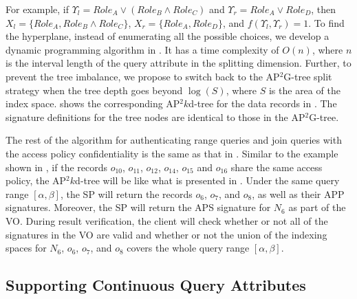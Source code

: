 For example, if $\Upsilon_l = {Role}_{A} \lor ({Role}_{B} \land {Role}_{C})$ and $\Upsilon_r = {Role}_{A} \lor {Role}_{D}$, then $X_l = \{ {Role}_{A}, {Role}_{B} \land {Role}_{C} \}$, $X_r = \{ {Role}_{A}, {Role}_{D} \}$, and $f(\Upsilon_l, \Upsilon_r) = 1$.
To find the hyperplane, instead of enumerating all the possible choices, we develop a dynamic programming algorithm in .
It has a time complexity of $O(n)$, where $n$ is the interval length of the query attribute in the splitting dimension.
Further, to prevent the tree imbalance, we propose to switch back to the AP$^2$G-tree split strategy when the tree depth goes beyond $\log(S)$, where $S$ is the area of the index space.
 shows the corresponding AP$^2k$d-tree for the data records in . The signature definitions for the tree nodes are identical to those in the AP$^2$G-tree.

The rest of the algorithm for authenticating range queries and join queries with the access policy confidentiality is the same as that in .
Similar to the example shown in , if the records $o_{10}$, $o_{11}$, $o_{12}$, $o_{14}$, $o_{15}$ and $o_{16}$ share the same access policy, the AP$^2k$d-tree will be like what is presented in . Under the same query range $[\alpha, \beta]$, the SP will return the records $o_6$, $o_7$, and $o_8$, as well as their APP signatures. Moreover, the SP will return the APS signature for $N_6$ as part of the VO\@. During result verification, the client will check whether or not all of the signatures in the VO are valid and whether or not the union of the indexing spaces for $N_6$, $o_6$, $o_7$, and $o_8$ covers the whole query range $[\alpha,\beta]$.

\subsection{Supporting Continuous Query Attributes}\label{sec:access-control:continuous-attribute}

